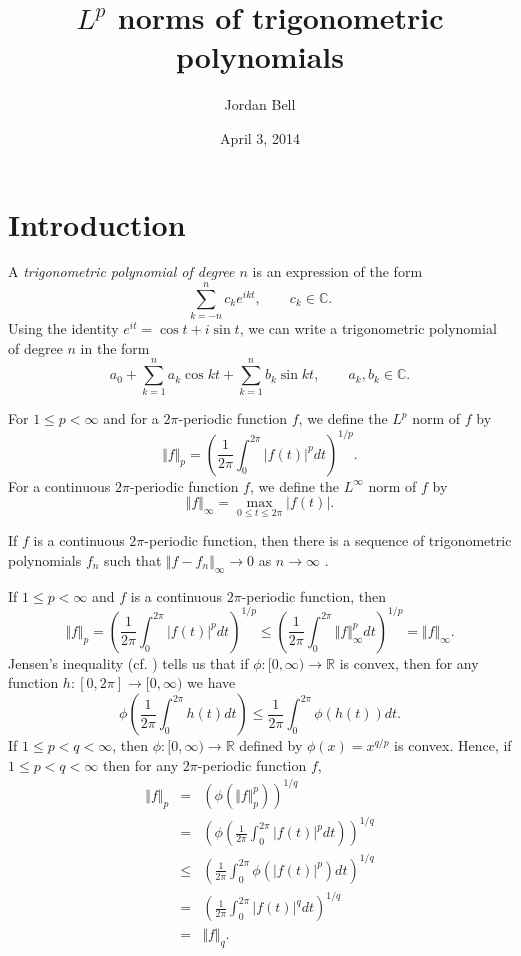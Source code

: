 \documentclass{article}
\newcommand{\norm}[1]{\Vert #1 \Vert}
\theoremstyle{definition}
\begin{document}
\title{$L^p$ norms of trigonometric polynomials}
\author{Jordan Bell}
\date{April 3, 2014}

\maketitle

\section{Introduction}
A {\em trigonometric polynomial of degree $n$} is an expression  of the form
\[
\sum_{k=-n}^n c_k e^{ikt}, \qquad c_k \in \mathbb{C}.
\]
Using the identity $e^{it}=\cos t+i\sin t$, we can write a trigonometric polynomial of degree $n$ in the form
\[
a_0+\sum_{k=1}^n a_k \cos kt + \sum_{k=1}^n b_k \sin kt, \qquad a_k, b_k \in \mathbb{C}.
\]

For $1 \leq p < \infty$ and for a $2\pi$-periodic function $f$, we define the $L^p$ norm of $f$ by
\[
\norm{f}_p=\left(\frac{1}{2\pi} \int_0^{2\pi} |f(t)|^p dt \right)^{1/p}.
\]
For a continuous $2\pi$-periodic function $f$, we define the $L^\infty$ norm of $f$ by
\[
\norm{f}_\infty=\max_{0 \leq t \leq 2\pi} |f(t)|.
\] 


If $f$ is a continuous $2\pi$-periodic function, then there is a sequence of trigonometric polynomials $f_n$ such that
$\norm{f-f_n}_\infty \to 0$ as $n \to \infty$
\cite[p.~54, Corollary~5.4]{steinI}. 

If $1 \leq p < \infty$ and $f$ is a continuous $2\pi$-periodic function, then 
\[
\norm{f}_p = \left( \frac{1}{2\pi} \int_0^{2\pi} |f(t)|^p dt \right)^{1/p} \leq \left( \frac{1}{2\pi} \int_0^{2\pi} \norm{f}_\infty^p dt \right)^{1/p}= \norm{f}_\infty.
\]
Jensen's inequality \cite[p.~44, Theorem 2.2]{lieb} (cf. \cite[p.~113, Problem 7.5]{master}) tells us that if
$\phi:[0,\infty) \to \mathbb{R}$ is convex, then for any function $h:[0,2\pi] \to [0,\infty)$ we have
\[
\phi \left( \frac{1}{2\pi} \int_0^{2\pi} h(t) dt \right) \leq \frac{1}{2\pi} \int_0^{2\pi} \phi(h(t)) dt.
\]
If $1 \leq p < q < \infty$, then $\phi:[0,\infty) \to \mathbb{R}$ defined by $\phi(x)=x^{q/p}$ is convex. Hence, if $1 \leq p < q < \infty$ then for any $2\pi$-periodic function $f$,
\begin{eqnarray*}
\norm{f}_p&=&(\phi(\norm{f}_p^p))^{1/q}\\
&=&\left( \phi\left( \frac{1}{2\pi}\int_0^{2\pi} |f(t)|^p dt \right) \right)^{1/q}\\
&\leq&\left( \frac{1}{2\pi} \int_0^{2\pi} \phi(|f(t)|^p) dt \right)^{1/q}\\
&=&\left( \frac{1}{2\pi} \int_0^{2\pi} |f(t)|^q dt \right)^{1/q}\\
&=&\norm{f}_q.
\end{eqnarray*}
\end{document}
